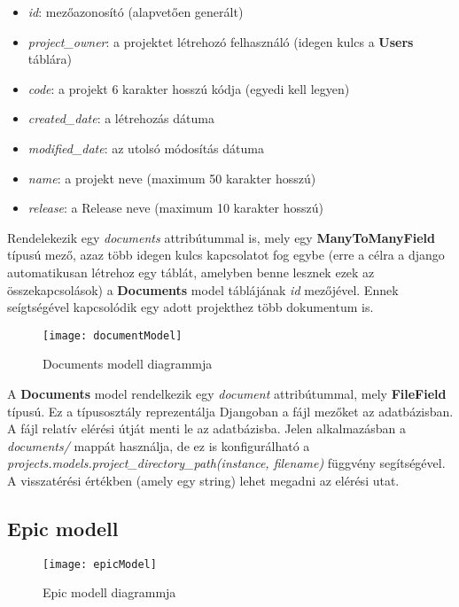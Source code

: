 \begin{itemize}
	\item \textit{id}: mezőazonosító (alapvetően generált)
	\item \textit{project\_owner}: a projektet létrehozó felhasználó (idegen kulcs a \textbf{Users} táblára)
	\item \textit{code}: a projekt 6 karakter hosszú kódja (egyedi kell legyen)
	\item \textit{created\_date}: a létrehozás dátuma
	\item \textit{modified\_date}: az utolsó módosítás dátuma
	\item \textit{name}: a projekt neve (maximum 50 karakter hosszú)
	\item \textit{release}: a Release neve (maximum 10 karakter hosszú)
\end{itemize}

Rendelekezik egy \textit{documents} attribútummal is, mely egy \textbf{ManyToManyField} típusú mező, azaz több idegen kulcs kapcsolatot fog egybe (erre a célra a django automatikusan létrehoz egy táblát, amelyben benne lesznek ezek az összekapcsolások) a \textbf{Documents} model táblájának \textit{id} mezőjével. Ennek seígtségével kapcsolódik egy adott projekthez több dokumentum is.

\begin{figure}[H]
	\centering
	\texttt{[image: documentModel]}
	\caption{Documents modell diagrammja}
	\label{fig:docmodel}
\end{figure}

A \textbf{Documents} model rendelkezik egy \textit{document} attribútummal, mely \textbf{FileField} típusú. Ez a típusosztály reprezentálja Djangoban a fájl mezőket az adatbázisban. A fájl relatív elérési útját menti le az adatbázisba. Jelen alkalmazásban a \textit{documents/} mappát használja, de ez is konfigurálható a \textit{projects.models.project\_directory\_path(instance, filename)} függvény segítségével. A visszatérési értékben (amely egy string) lehet megadni az elérési utat.

\subsection{Epic modell}

\begin{figure}[H]
	\centering
	\texttt{[image: epicModel]}
	\caption{Epic modell diagrammja}
	\label{fig:epicmodel}
\end{figure}

